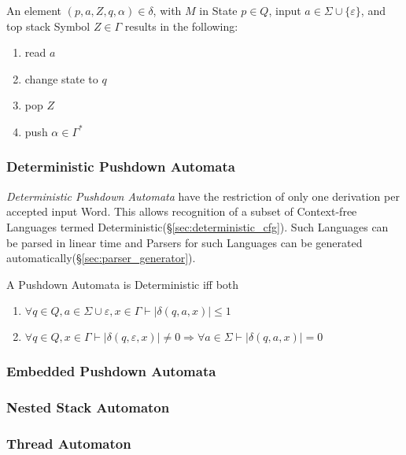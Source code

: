 An element $(p,a,Z,q,\alpha)\in\delta$, with $M$ in State $p \in Q$,
input $a \in \Sigma \cup \{\varepsilon\}$, and top stack Symbol $Z \in
\Gamma$ results in the following:
\begin{enumerate}
\item read $a$
\item change state to $q$
\item pop $Z$
\item push $\alpha \in \Gamma^*$
\end{enumerate}



\subsubsection{Deterministic Pushdown Automata}\label{sec:deterministic_pda}

\emph{Deterministic Pushdown Automata} have the restriction of only
one derivation per accepted input Word. This allows recognition of a
subset of Context-free Languages termed
Deterministic(\S\ref{sec:deterministic_cfg}). Such Languages can be
parsed in linear time and Parsers for such Languages can be generated
automatically(\S\ref{sec:parser_generator}).

A Pushdown Automata is Deterministic iff both
\begin{enumerate}
\item $\forall q \in Q, a \in \Sigma \cup {\varepsilon}, x \in
  \Gamma \vdash |\delta(q,a,x)| \leq 1$
\item $\forall q \in Q, x \in \Gamma \vdash |\delta(q,\varepsilon,x)|
  \neq 0 \Rightarrow \forall a \in \Sigma \vdash |\delta(q,a,x)|=0$
\end{enumerate}



\subsubsection{Embedded Pushdown Automata}\label{sec:embedded_pushdown}



\subsubsection{Nested Stack Automaton}\label{sec:nested_stack_automaton}



\subsubsection{Thread Automaton}\label{sec:thread_automaton}



